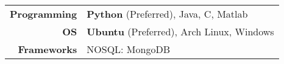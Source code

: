 
\tabcolsep=0.11cm
\begin{tabular}{rl}
  \textbf{Programming} & {\bf Python} (Preferred), Java, C, Matlab \\
  \textbf{OS} & {\bf Ubuntu} (Preferred), Arch Linux, Windows \\
  \textbf{Frameworks} & NOSQL: MongoDB\\
\end{tabular}


